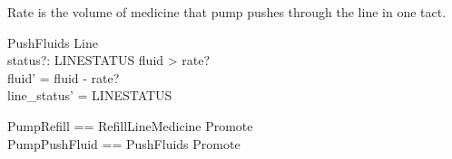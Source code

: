 \documentclass{article}
\begin{document}
	Rate is the volume of medicine that pump pushes through the line in one tact.
	\begin{schema}{PushFluids}
		\Delta Line \\
		status?: LINESTATUS
	\where 
		fluid > rate? \\
		fluid' = fluid - rate? \\
		line_status' = LINESTATUS
	\end{schema}

\begin{zed}
	PumpRefill == RefillLineMedicine \land Promote\\
	PumpPushFluid == PushFluids \land Promote\\
\end{zed}
\end{document}
